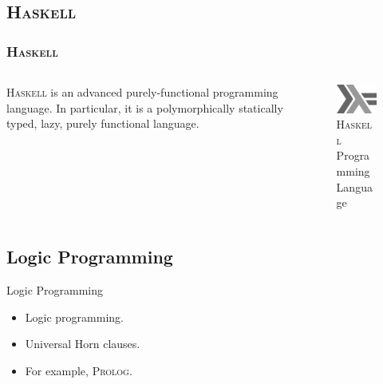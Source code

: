 \documentclass[hideothersubsections, t, aspectratio=1610]{beamer}
\newcommand{\progLang}[1]{\textsc{#1}}
\begin{document}
\subsection{\progLang{Haskell}}
\begin{frame}
\frametitle{\progLang{Haskell}}
  \begin{columns}[T]
    \begin{column}{.7\textwidth}
     \begin{block}{}
\progLang{Haskell} is an advanced purely-functional programming language. In particular, it is a polymorphically statically typed, lazy, purely functional language.
\note[item]{}
    \end{block}
    \end{column}
    \begin{column}{.3\textwidth}
    \begin{block}{}
\begin{figure}
    \includegraphics[width=\textwidth]{haskelllogo.jpg} 
    \caption{\progLang{Haskell} Programming Language}
 \end{figure}   
    \end{block}
    \end{column}
  \end{columns}
\end{frame}




\subsection{Logic Programming}
\begin{frame}{Logic Programming}
\begin{itemize}
\item Logic programming.

\item Universal Horn clauses.

\item For example, \progLang{Prolog}.
\end{itemize}
\end{frame}
\end{document}

